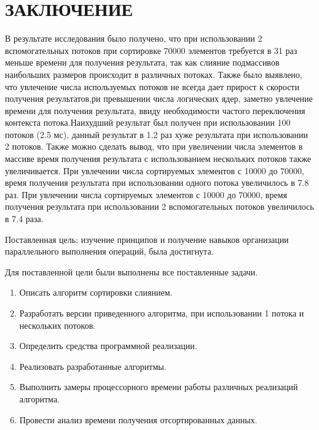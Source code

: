 \chapter*{\hfill{\centering  ЗАКЛЮЧЕНИЕ}\hfill}

В результате исследования было получено, что при использовании 2 вспомогательных потоков при сортировке 70000 элементов требуется в 31 раз меньше времени для получения результата, так как слияние подмассивов наибольших размеров происходит в различных потоках. Также было выявлено, что увлечение числа используемых потоков не всегда дает прирост к скорости получения результатов,ри превышении числа логических ядер, заметно увлечение времени для получения результата, ввиду необходимости частого переключения контекста потока.Наихудший результат был получен при использовании 100 потоков (2.5 мс), данный результат в 1.2 раз хуже результата при использовании 2 потоков. Также можно сделать вывод, что при увеличении числа элементов в массиве
время получения результата с использованием нескольких потоков также увеличивается. При увлечении числа сортируемых элементов с 10000 до 70000, время получения результата при использовании одного потока  увеличилось в 7.8 раз.
При увлечении числа сортируемых элементов с 10000 до 70000, время получения результата при использовании 2 вспомогательных потоков увеличилось в 7.4 раза.


Поставленная цель: изучение принципов и получение навыков организации параллельного выполнения операций, была достигнута.

Для поставленной цели были выполнены все поставленные задачи.
\label{sec:targets}
\begin{enumerate}
	\item Описать алгоритм сортировки слиянием.
	\item Разработать версии  приведенного алгоритма, при использовании 1 потока и нескольких потоков.
	\item Определить средства программной реализации.
	\item Реализовать разработанные алгоритмы.
	\item Выполнить замеры процессорного времени работы различных реализаций алгоритма.
	\item Провести анализ времени получения отсортированных данных.
\end{enumerate}

 

